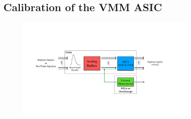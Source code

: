 \subsection{Calibration of the VMM ASIC}
\label{sec:calib_alg}

\begin{figure}[!htb]
    \begin{center}
        \includegraphics[width=0.8\textwidth]{figures/nsw/vrs/xadc_diagramPDF}
        \caption{
        }
        \label{fig:xadc_diagram}
    \end{center}
\end{figure}
